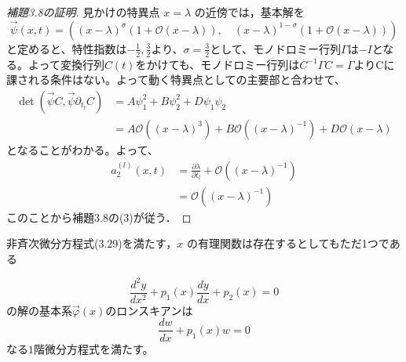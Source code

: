 \begin{story}
\begin{proof}[補題3.8の証明]
見かけの特異点 $x=\lambda$ の近傍では，基本解を
\begin{equation*}
    \vec{\psi}(x,t) = \left( (x-\lambda)^\sigma(1+\mathcal{O}(x-\lambda)), \quad (x-\lambda)^{1-\sigma}(1+\mathcal{O}(x-\lambda)) \right)
\end{equation*}
と定めると、特性指数は$-\frac{1}{2},\frac{3}{2}$より、$\sigma=\frac{3}{2}$として、モノドロミー行列$\Gamma$は$-I$となる。よって変換行列$C(t)$をかけても、モノドロミー行列は$C^{-1}\Gamma C=\Gamma$よりCに課される条件はない。よって動く特異点としての主要部と合わせて、
\begin{align*}
\det(\vec{\psi}C, \vec{\psi}\partial_{t_l}C) &= A\psi_1^2 + B\psi_2^2 + D\psi_1\psi_2\\
&=A\mathcal{O}((x-\lambda)^{3}) + B\mathcal{O}((x-\lambda)^{-1}) + D\mathcal{O}(x-\lambda)
\end{align*}
となることがわかる。よって、
\begin{align*}
a_{2}^{(l)}(x,t)&=\frac{\partial \lambda}{\partial t_l}+\mathcal{O}((x-\lambda)^{-1})\\
&=\mathcal{O}((x-\lambda)^{-1})
\end{align*}
このことから補題3.8の(3)が従う．
\end{proof}
\end{story}
\begin{proposition}[3.8]
非斉次微分方程式(3.29)を満たす，$x$ の有理関数は存在するとしてもただ1つである
\end{proposition}

\begin{proposition}[2.2]
    \[
    \frac{d^{2}y}{dx^{2}}+p_{1}(x)\frac{dy}{dx}+p_{2}(x)=0
    \]
    の解の基本系$\vec{\varphi}(x)$のロンスキアンは
    \[
    \frac{dw}{dx}+p_{1}(x)w=0
    \]
    なる$1$階微分方程式を満たす。
\end{proposition}

